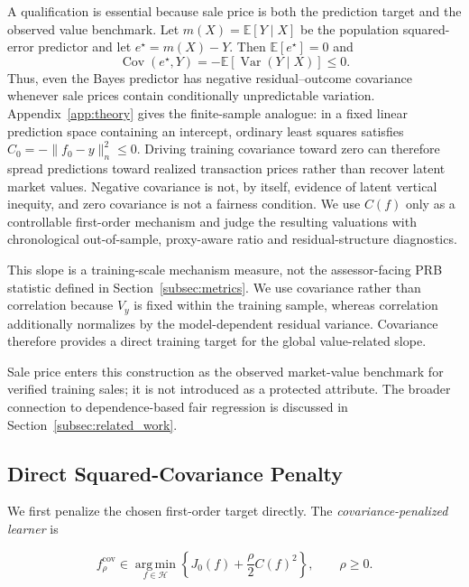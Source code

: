 \documentclass[10pt]{article}
\theoremstyle{definition}
\newcommand{\E}{\mathbb{E}}
\newcommand{\Cov}{\operatorname{Cov}}
\newcommand{\Var}{\operatorname{Var}}
\newcommand{\1}{\mathbf{1}}
\newcommand{\Hcal}{\mathcal{H}}
\newcommand{\argminop}{\operatorname*{arg\,min}}
\begin{document}
A qualification is essential because sale price is both the prediction target and the observed value benchmark. Let $m(X)=\E[Y\mid X]$ be the population squared-error predictor and let $e^\star=m(X)-Y$. Then $\E[e^\star]=0$ and
\begin{equation}
\label{eq:bayes_residual_covariance}
\Cov(e^\star,Y)=-\E\!\left[\Var(Y\mid X)\right]\leq0.
\end{equation}
Thus, even the Bayes predictor has negative residual--outcome covariance whenever sale prices contain conditionally unpredictable variation. Appendix~\ref{app:theory} gives the finite-sample analogue: in a fixed linear prediction space containing an intercept, ordinary least squares satisfies $C_0=-\lVert f_0-y\rVert_n^2\leq0$. Driving training covariance toward zero can therefore spread predictions toward realized transaction prices rather than recover latent market values. Negative covariance is not, by itself, evidence of latent vertical inequity, and zero covariance is not a fairness condition. We use $C(f)$ only as a controllable first-order mechanism and judge the resulting valuations with chronological out-of-sample, proxy-aware ratio and residual-structure diagnostics.

{This slope is a training-scale mechanism measure, not the assessor-facing PRB statistic defined in Section~\ref{subsec:metrics}. We use covariance rather than correlation because $V_y$ is fixed within the training sample, whereas correlation additionally normalizes by the model-dependent residual variance. Covariance therefore provides a direct training target for the global value-related slope.}

{Sale price enters this construction as the observed market-value benchmark for verified training sales; it is not introduced as a protected attribute. The broader connection to dependence-based fair regression is discussed in Section~\ref{subsec:related_work}.}


\subsection{{Direct Squared-Covariance Penalty}}
\label{subsec:direct_penalty}

{We first penalize the chosen first-order target directly. The \emph{covariance-penalized learner} is}


{
\begin{equation}
\label{eq:direct_penalty}
f_\rho^{\mathrm{cov}}
\in
\argminop_{f\in\Hcal}
\left\{
J_0(f)+\frac{\rho}{2}C(f)^2
\right\},
\qquad
\rho\geq 0.
\end{equation}
}
\end{document}
